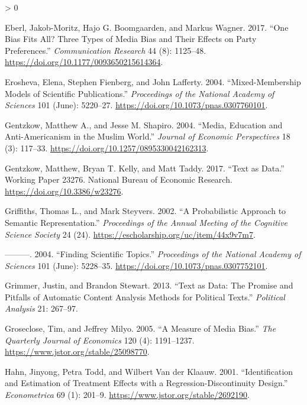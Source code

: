 \documentclass[
]{article}
\newlength{\cslhangindent}
\newenvironment{CSLReferences}[2] %
 {%
  \setlength{\parindent}{0pt}
  \ifodd #1 \everypar{\setlength{\hangindent}{\cslhangindent}}\ignorespaces\fi
  \ifnum #2 > 0
  \setlength{\parskip}{#2\baselineskip}
  \fi
 }%
 {}
\begin{document}
\begin{CSLReferences}{1}{0}
\leavevmode\hypertarget{ref-eberl_one_2017}{}%
Eberl, Jakob-Moritz, Hajo G. Boomgaarden, and Markus Wagner. 2017.
{``One Bias Fits All? Three Types of Media Bias and Their Effects on
Party Preferences.''} \emph{Communication Research} 44 (8): 1125--48.
\url{https://doi.org/10.1177/0093650215614364}.

\leavevmode\hypertarget{ref-erosheva_mixed-membership_2004}{}%
Erosheva, Elena, Stephen Fienberg, and John Lafferty. 2004.
{``Mixed-Membership Models of Scientific Publications.''}
\emph{Proceedings of the National Academy of Sciences} 101 (June):
5220--27. \url{https://doi.org/10.1073/pnas.0307760101}.

\leavevmode\hypertarget{ref-gentzkow_media_2004}{}%
Gentzkow, Matthew A., and Jesse M. Shapiro. 2004. {``Media, Education
and Anti-Americanism in the Muslim World.''} \emph{Journal of Economic
Perspectives} 18 (3): 117--33.
\url{https://doi.org/10.1257/0895330042162313}.

\leavevmode\hypertarget{ref-gentzkow_text_2017}{}%
Gentzkow, Matthew, Bryan T. Kelly, and Matt Taddy. 2017. {``Text as
Data.''} Working Paper 23276. National Bureau of Economic Research.
\url{https://doi.org/10.3386/w23276}.

\leavevmode\hypertarget{ref-griffiths_probabilistic_2002}{}%
Griffiths, Thomas L., and Mark Steyvers. 2002. {``A Probabilistic
Approach to Semantic Representation.''} \emph{Proceedings of the Annual
Meeting of the Cognitive Science Society} 24 (24).
\url{https://escholarship.org/uc/item/44x9v7m7}.

\leavevmode\hypertarget{ref-griffiths_finding_2004}{}%
---------. 2004. {``Finding Scientific Topics.''} \emph{Proceedings of
the National Academy of Sciences} 101 (June): 5228--35.
\url{https://doi.org/10.1073/pnas.0307752101}.

\leavevmode\hypertarget{ref-grimmer_text_2013}{}%
Grimmer, Justin, and Brandon Stewart. 2013. {``Text as Data: The Promise
and Pitfalls of Automatic Content Analysis Methods for Political
Texts.''} \emph{Political Analysis} 21: 267--97.

\leavevmode\hypertarget{ref-groseclose_measure_2005}{}%
Groseclose, Tim, and Jeffrey Milyo. 2005. {``A Measure of Media Bias.''}
\emph{The Quarterly Journal of Economics} 120 (4): 1191--1237.
\url{https://www.jstor.org/stable/25098770}.

\leavevmode\hypertarget{ref-hahn_identification_2001}{}%
Hahn, Jinyong, Petra Todd, and Wilbert Van der Klaauw. 2001.
{``Identification and Estimation of Treatment Effects with a
Regression-Discontinuity Design.''} \emph{Econometrica} 69 (1): 201--9.
\url{https://www.jstor.org/stable/2692190}.


\end{CSLReferences}
\end{document}
